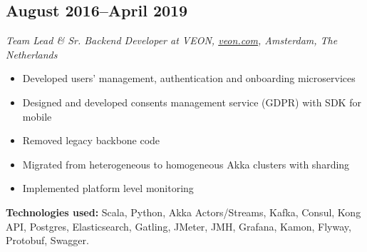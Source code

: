 \subsection*{August 2016--April 2019}

\textit{Team Lead \& Sr. Backend Developer at VEON,
\href{https://veon.com}{\url{veon.com}}, Amsterdam, The Netherlands}

\begin{itemize}[noitemsep]
  \item Developed users' management, authentication and onboarding microservices
  \item Designed and developed consents management service (GDPR) with SDK for mobile
  \item Removed legacy backbone code
  \item Migrated from heterogeneous to homogeneous Akka clusters with sharding
  \item Implemented platform level monitoring
\end{itemize}

\textbf{Technologies used:}
Scala, Python, Akka Actors/Streams, Kafka, Consul, Kong API, Postgres, Elasticsearch, Gatling, JMeter, JMH, Grafana, Kamon,
Flyway, Protobuf, Swagger.

